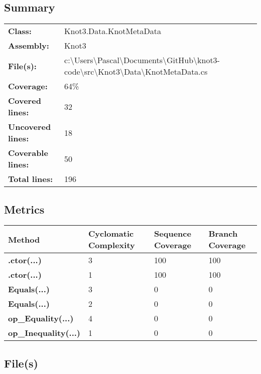 \documentclass[a4paper,10pt]{article}
\begin{document}
\subsection{Summary}
\begin{longtable}[l]{ll}
\textbf{Class:} & Knot3.Data.KnotMetaData\\
\textbf{Assembly:} & Knot3\\
\textbf{File(s):} & \begin{minipage}[t]{12cm}{c:\textbackslash Users\textbackslash Pascal\textbackslash Documents\textbackslash GitHub\textbackslash knot3-code\textbackslash src\textbackslash Knot3\textbackslash Data\textbackslash KnotMetaData.cs}\end{minipage} \\
\textbf{Coverage:} & 64\%\\
\textbf{Covered lines:} & 32\\
\textbf{Uncovered lines:} & 18\\
\textbf{Coverable lines:} & 50\\
\textbf{Total lines:} & 196\\
\end{longtable}
\subsection{Metrics}
\begin{longtable}[l]{|l|l|l|l|}
\hline
\textbf{Method} & \textbf{Cyclomatic Complexity} & \textbf{Sequence Coverage} & \textbf{Branch Coverage}\\
\hline
\textbf{.ctor(...)} & 3 & 100 & 100\\
\hline
\textbf{.ctor(...)} & 1 & 100 & 100\\
\hline
\textbf{Equals(...)} & 3 & 0 & 0\\
\hline
\textbf{Equals(...)} & 2 & 0 & 0\\
\hline
\textbf{op\_Equality(...)} & 4 & 0 & 0\\
\hline
\textbf{op\_Inequality(...)} & 1 & 0 & 0\\
\hline
\end{longtable}
\subsection{File(s)}
\end{document}
